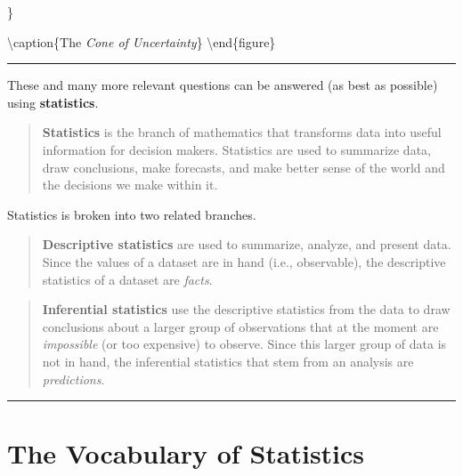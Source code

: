 \documentclass[
]{book}
\begin{document}
\}

\textbackslash caption\{The \emph{Cone of Uncertainty}\}\label{fig:unnamed-chunk-5}
\textbackslash end\{figure\}

\begin{center}\rule{0.5\linewidth}{0.5pt}\end{center}

These and many more relevant questions can be answered (as best as possible) using \textbf{statistics}.

\begin{quote}
\textbf{Statistics} is the branch of mathematics that transforms data into useful information for decision makers. Statistics are used to summarize data, draw conclusions, make forecasts, and make better sense of the world and the decisions we make within it.
\end{quote}

Statistics is broken into two related branches.

\begin{quote}
\textbf{Descriptive statistics} are used to summarize, analyze, and present data. Since the values of a dataset are in hand (i.e., observable), the descriptive statistics of a dataset are \emph{facts}.
\end{quote}

\begin{quote}
\textbf{Inferential statistics} use the descriptive statistics from the data to draw conclusions about a larger group of observations that at the moment are \emph{impossible} (or too expensive) to observe. Since this larger group of data is not in hand, the inferential statistics that stem from an analysis are \emph{predictions}.
\end{quote}

\begin{center}\rule{0.5\linewidth}{0.5pt}\end{center}

\hypertarget{the-vocabulary-of-statistics}{%
\section{The Vocabulary of Statistics}\label{the-vocabulary-of-statistics}}
\end{document}
